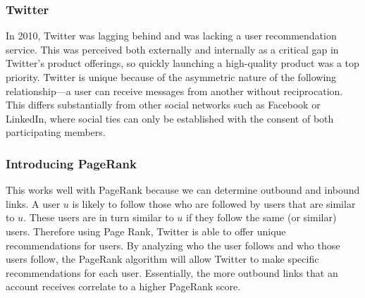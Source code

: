 \documentclass{beamer}
\begin{document}
\begin{frame}[t]
    \frametitle{Twitter}
    \begin{outline}
        \1 In 2010, Twitter was lagging behind and was lacking a user recommendation service. 
        \1 This was perceived both externally and internally as a critical gap in Twitter’s product offerings, so quickly launching a high-quality product was a top priority.
        \1 Twitter is unique because of the asymmetric nature of the following relationship—a user can receive messages from another without reciprocation. 
        \1 This differs substantially from other social networks such as Facebook or LinkedIn, where social ties can only be established with the consent of both participating members.
    \end{outline}
\end{frame}

\begin{frame}[t]
    \frametitle{Introducing PageRank}
    \begin{outline}
        \1 This works well with PageRank because we can determine outbound and inbound links.
        \1 A user $u$ is likely to follow those who are followed by users that are similar to $u$. 
        \1 These users are in turn similar to $u$ if they follow the same (or similar) users.
        \1 Therefore using Page Rank, Twitter is able to offer unique recommendations for users. 
        \1 By analyzing who the user follows and who those users follow, the PageRank algorithm will allow Twitter to make specific recommendations for each user. 
        \1 Essentially, the more outbound links that an account receives correlate to a higher PageRank score.        
    \end{outline}
\end{frame}
\end{document}
